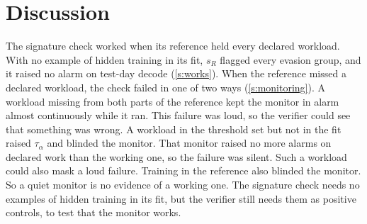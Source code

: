 \section{Discussion}\label{s:discussion}

The signature check worked when its reference held every declared workload. With no
example of hidden training in its fit, $s_R$ flagged every evasion group, and it
raised no alarm on test-day decode (\cref{s:works}). When the reference missed a declared
workload, the check failed in one of two ways (\cref{s:monitoring}). A workload missing
from both parts of the reference kept the monitor in alarm almost continuously while it
ran. This failure was loud, so the verifier could see that something was wrong. A workload in
the threshold set but not in the fit raised $\tau_\alpha$ and blinded the monitor. That
monitor raised no more alarms on declared work than the working one, so the failure was
silent. Such a workload could also mask a loud failure. Training in the reference also blinded the
monitor. So a quiet monitor is no evidence of a working one. The signature check needs no examples of hidden
training in its fit, but the verifier still needs them as positive controls, to test that
the monitor works.


